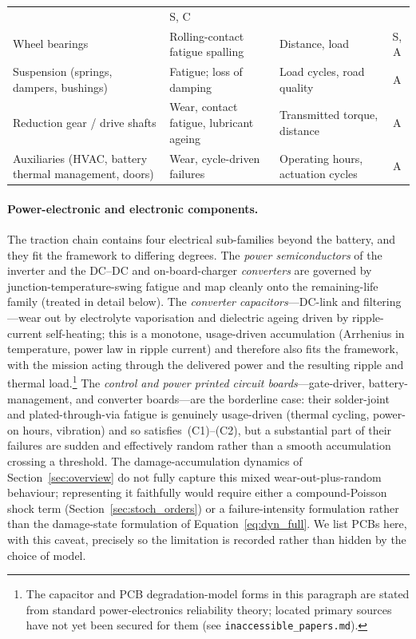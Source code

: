 \documentclass[11pt,a4paper]{article}
\theoremstyle{plain}
\theoremstyle{definition}
\theoremstyle{remark}
\begin{document}
\begin{table}[htbp]
\begin{tabular}{@{}p{3.0cm}p{4.6cm}p{3.5cm}c@{}}
  & S, C \\[3pt]
Wheel bearings
  & Rolling-contact fatigue spalling
  & Distance, load
  & S, A \\[3pt]
Suspension (springs, dampers, bushings)
  & Fatigue; loss of damping
  & Load cycles, road quality
  & A \\[3pt]
Reduction gear / drive shafts
  & Wear, contact fatigue, lubricant ageing
  & Transmitted torque, distance
  & A \\[3pt]
Auxiliaries (HVAC, battery thermal management, doors)
  & Wear, cycle-driven failures
  & Operating hours, actuation cycles
  & A \\
\bottomrule
\end{tabular}
\end{table}

\paragraph{Power-electronic and electronic components.}
The traction chain contains four electrical sub-families beyond the battery, and they fit the framework to differing degrees.
The \emph{power semiconductors} of the inverter and the DC--DC and on-board-charger \emph{converters} are governed by junction-temperature-swing fatigue and map cleanly onto the remaining-life family (treated in detail below).
The \emph{converter capacitors}---DC-link and filtering---wear out by electrolyte vaporisation and dielectric ageing driven by ripple-current self-heating; this is a monotone, usage-driven accumulation (Arrhenius in temperature, power law in ripple current) and therefore also fits the framework, with the mission acting through the delivered power and the resulting ripple and thermal load.\footnote{The capacitor and PCB degradation-model forms in this paragraph are stated from standard power-electronics reliability theory; located primary sources have not yet been secured for them (see \texttt{inaccessible\_papers.md}).}
The \emph{control and power printed circuit boards}---gate-driver, battery-management, and converter boards---are the borderline case: their solder-joint and plated-through-via fatigue is genuinely usage-driven (thermal cycling, power-on hours, vibration) and so satisfies~(C1)--(C2), but a substantial part of their failures are sudden and effectively random rather than a smooth accumulation crossing a threshold.
The damage-accumulation dynamics of Section~\ref{sec:overview} do not fully capture this mixed wear-out-plus-random behaviour; representing it faithfully would require either a compound-Poisson shock term (Section~\ref{sec:stoch_orders}) or a failure-intensity formulation rather than the damage-state formulation of Equation~\eqref{eq:dyn_full}.
We list PCBs here, with this caveat, precisely so the limitation is recorded rather than hidden by the choice of model.
\end{document}
